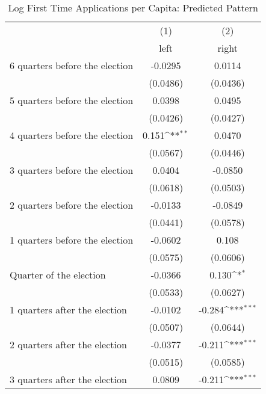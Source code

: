 \begin{table}[htbp]\centering
\def\sym#1{\ifmmode^{#1}\else\(^{#1}\)\fi}
\caption{Log First Time Applications per Capita: Predicted Pattern}
\begin{tabular}{l*{2}{c}}
\hline\hline
                    &\multicolumn{1}{c}{(1)}&\multicolumn{1}{c}{(2)}\\
                    &\multicolumn{1}{c}{left}&\multicolumn{1}{c}{right}\\
\hline
 6 quarters before the election&     -0.0295         &      0.0114         \\
                    &    (0.0486)         &    (0.0436)         \\
[1em]
 5 quarters before the election&      0.0398         &      0.0495         \\
                    &    (0.0426)         &    (0.0427)         \\
[1em]
 4 quarters before the election&       0.151\sym{**} &      0.0470         \\
                    &    (0.0567)         &    (0.0446)         \\
[1em]
 3 quarters before the election&      0.0404         &     -0.0850         \\
                    &    (0.0618)         &    (0.0503)         \\
[1em]
 2 quarters before the election&     -0.0133         &     -0.0849         \\
                    &    (0.0441)         &    (0.0578)         \\
[1em]
 1 quarters before the election&     -0.0602         &       0.108         \\
                    &    (0.0575)         &    (0.0606)         \\
[1em]
Quarter of the election&     -0.0366         &       0.130\sym{*}  \\
                    &    (0.0533)         &    (0.0627)         \\
[1em]
 1 quarters after the election&     -0.0102         &      -0.284\sym{***}\\
                    &    (0.0507)         &    (0.0644)         \\
[1em]
 2 quarters after the election&     -0.0377         &      -0.211\sym{***}\\
                    &    (0.0515)         &    (0.0585)         \\
[1em]
 3 quarters after the election&      0.0809         &      -0.211\sym{***}\\

\end{tabular}
\end{table}
